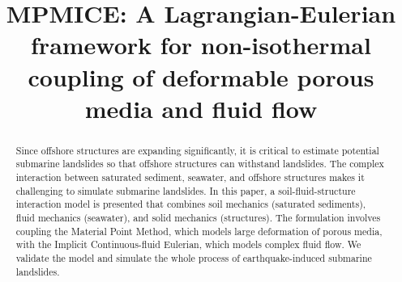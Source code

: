\documentclass[preprint,12pt]{elsarticle}
\begin{document}

%
\setcounter{equation}{0}
\setcounter{figure}{0}
\setcounter{section}{0}
%
 

\begin{frontmatter}



\title{MPMICE: A Lagrangian-Eulerian framework for non-isothermal coupling of deformable porous media and fluid flow}



\begin{abstract}
Since offshore structures are expanding significantly, it is critical to estimate potential submarine landslides so that offshore structures can withstand landslides. The complex interaction between saturated sediment, seawater, and offshore structures makes it challenging to simulate submarine landslides. In this paper, a soil-fluid-structure interaction model is presented that combines soil mechanics (saturated sediments), fluid mechanics (seawater), and solid mechanics (structures). The formulation involves coupling the Material Point Method, which models large deformation of porous media, with the Implicit Continuous-fluid Eulerian, which models complex fluid flow. We validate the model and simulate the whole process of earthquake-induced submarine landslides. 
\end{abstract}


\end{frontmatter}
\end{document}
